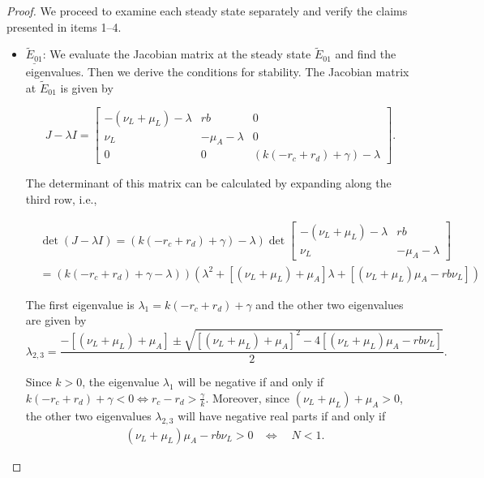 \documentclass{article}
\theoremstyle{remark}
\theoremstyle{custom} %
\begin{document}
\begin{proof} 

We proceed to examine each steady state separately and verify the claims presented in items 1--4.

 \begin{itemize}

  \item $\underline{\tilde{E}_{01}}$: We evaluate the Jacobian matrix at the steady state ${\tilde{E}_{01}}$ and find the eigenvalues. Then we derive the conditions for stability. The Jacobian matrix at ${\tilde{E}_{01}}$ is given by

$$
J-\lambda I=\left[\begin{array}{ccc}
-\left(\nu_L+\mu_L\right)-\lambda & r b & 0 \\
\nu_L & -\mu_A-\lambda & 0 \\
0 & 0 & (k(- r_c +r_d)+\gamma)-\lambda
\end{array}\right].
$$

The determinant of this matrix can be calculated by expanding along the third row, i.e.,


$$
\begin{aligned}
& \left.\operatorname{det}(J-\lambda I)=\left(k\left(-r_c+r_d\right)+\gamma\right)-\lambda\right) \operatorname{det}\left[\begin{array}{cc}
-\left(\nu_L+\mu_L\right)-\lambda & r b \\
\nu_L & -\mu_A-\lambda
\end{array}\right] \\
& \left.=\left(k\left(-r_c+r_d\right)+\gamma-\lambda\right)\right)\left(\lambda^2+\left[\left(\nu_L+\mu_L\right)+\mu_A\right] \lambda+\left[\left(\nu_L+\mu_L\right) \mu_A-r b \nu_L\right]\right)
\end{aligned}
$$

The first eigenvalue is \(\lambda_1 = k(-r_c + r_d)+\gamma\) and the other two eigenvalues are given by 
$$\lambda_{2,3} = \frac{-\left[(\nu_L + \mu_L) + \mu_A\right] \pm \sqrt{\left[(\nu_L + \mu_L) + \mu_A\right]^2 - 4\left[(\nu_L + \mu_L) \mu_A - r b \nu_L\right]}}{2}.$$

Since $k>0$, the eigenvalue \(\lambda_1\) will be negative if and only if $k\left(-r_c+r_d\right)+\gamma<0 \Leftrightarrow r_c-r_d>\frac{\gamma}{k}$. Moreover, since  $(\nu_L + \mu_L) + \mu_A > 0 $,  the other two eigenvalues \(\lambda_{2,3}\) will have negative real parts if and only if
$$
\begin{aligned}
& \left(\nu_L+\mu_L\right) \mu_A-r b \nu_L>0 
& \Leftrightarrow\quad {N}<1.
\end{aligned}
$$


\end{itemize}
\end{proof}
\end{document}
